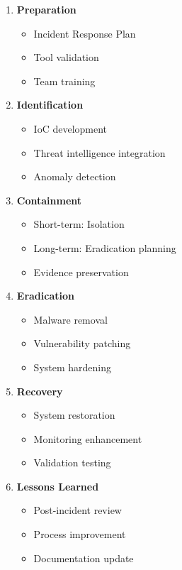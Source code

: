 \begin{enumerate}
\item \textbf{Preparation}
\begin{itemize}
\item Incident Response Plan
\item Tool validation
\item Team training
\end{itemize}

\item \textbf{Identification}
\begin{itemize}
\item IoC development
\item Threat intelligence integration
\item Anomaly detection
\end{itemize}

\item \textbf{Containment}
\begin{itemize}
\item Short-term: Isolation
\item Long-term: Eradication planning
\item Evidence preservation
\end{itemize}

\item \textbf{Eradication}
\begin{itemize}
\item Malware removal
\item Vulnerability patching
\item System hardening
\end{itemize}

\item \textbf{Recovery}
\begin{itemize}
\item System restoration
\item Monitoring enhancement
\item Validation testing
\end{itemize}

\item \textbf{Lessons Learned}
\begin{itemize}
\item Post-incident review
\item Process improvement
\item Documentation update
\end{itemize}
\end{enumerate}

